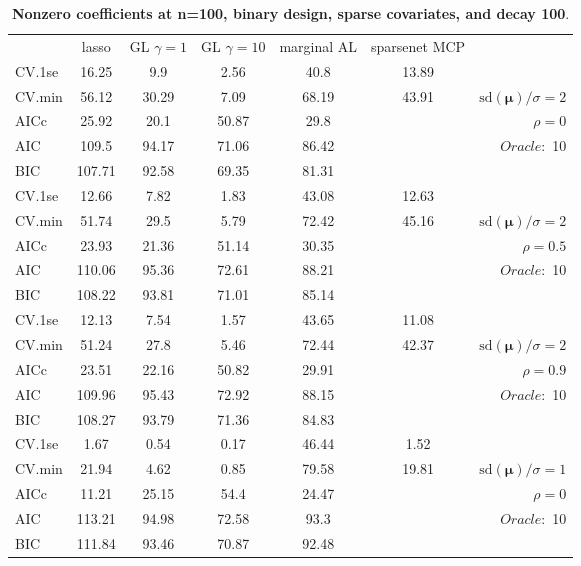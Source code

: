 \clearpage
\begin{table}\vspace{-.5cm}
\caption[l]{ { \bf Nonzero coefficients at n=100, binary design, 
sparse covariates, and  decay  100}.}
\vspace{-.5cm}
\footnotesize{}
\begin{center}
\begin{tabular}{l*{5}{c}|r}
& lasso & GL $\gamma=1$ & GL $\gamma=10$ & marginal AL & sparsenet MCP  & \\
 \cline{1-7}
CV.1se & 16.25 & 9.9 & 2.56 & 40.8 & 13.89 & \\
CV.min & 56.12 & 30.29 & 7.09 & 68.19 & 43.91 &  $\mathrm{sd}(\mathbf{\mu})/\sigma=2$ \\
AICc & 25.92 & 20.1 & 50.87 & 29.8 & & $\rho=0$ \\
AIC & 109.5 & 94.17 & 71.06 & 86.42 & &  \multirow{2}{*}{$Oracle: $ 10} \\
BIC & 107.71 & 92.58 & 69.35 & 81.31 & &  \\
 \hline 
CV.1se & 12.66 & 7.82 & 1.83 & 43.08 & 12.63 & \\
CV.min & 51.74 & 29.5 & 5.79 & 72.42 & 45.16 &  $\mathrm{sd}(\mathbf{\mu})/\sigma=2$ \\
AICc & 23.93 & 21.36 & 51.14 & 30.35 & & $\rho=0.5$ \\
AIC & 110.06 & 95.36 & 72.61 & 88.21 & &  \multirow{2}{*}{$Oracle: $ 10} \\
BIC & 108.22 & 93.81 & 71.01 & 85.14 & &  \\
 \hline 
CV.1se & 12.13 & 7.54 & 1.57 & 43.65 & 11.08 & \\
CV.min & 51.24 & 27.8 & 5.46 & 72.44 & 42.37 &  $\mathrm{sd}(\mathbf{\mu})/\sigma=2$ \\
AICc & 23.51 & 22.16 & 50.82 & 29.91 & & $\rho=0.9$ \\
AIC & 109.96 & 95.43 & 72.92 & 88.15 & &  \multirow{2}{*}{$Oracle: $ 10} \\
BIC & 108.27 & 93.79 & 71.36 & 84.83 & &  \\
 \hline 
CV.1se & 1.67 & 0.54 & 0.17 & 46.44 & 1.52 & \\
CV.min & 21.94 & 4.62 & 0.85 & 79.58 & 19.81 &  $\mathrm{sd}(\mathbf{\mu})/\sigma=1$ \\
AICc & 11.21 & 25.15 & 54.4 & 24.47 & & $\rho=0$ \\
AIC & 113.21 & 94.98 & 72.58 & 93.3 & &  \multirow{2}{*}{$Oracle: $ 10} \\
BIC & 111.84 & 93.46 & 70.87 & 92.48 & &  \\

\end{tabular}
\end{center}
\end{table}
